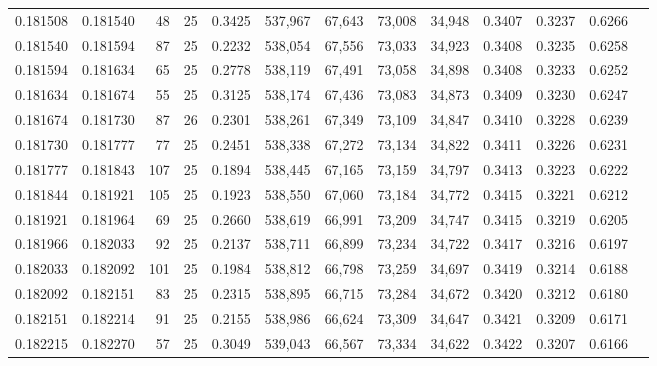 \begin{tabular}{rrrrrrrrrrrrr}
0.181508 & 0.181540 &    48 &  25 &                                     0.3425 & 537,967 &  67,643 &  73,008 &  34,948 & 0.3407 & 0.3237 & 0.6266 \\
0.181540 & 0.181594 &    87 &  25 &                                     0.2232 & 538,054 &  67,556 &  73,033 &  34,923 & 0.3408 & 0.3235 & 0.6258 \\
0.181594 & 0.181634 &    65 &  25 &                                     0.2778 & 538,119 &  67,491 &  73,058 &  34,898 & 0.3408 & 0.3233 & 0.6252 \\
0.181634 & 0.181674 &    55 &  25 &                                     0.3125 & 538,174 &  67,436 &  73,083 &  34,873 & 0.3409 & 0.3230 & 0.6247 \\
0.181674 & 0.181730 &    87 &  26 &                                     0.2301 & 538,261 &  67,349 &  73,109 &  34,847 & 0.3410 & 0.3228 & 0.6239 \\
0.181730 & 0.181777 &    77 &  25 &                                     0.2451 & 538,338 &  67,272 &  73,134 &  34,822 & 0.3411 & 0.3226 & 0.6231 \\
0.181777 & 0.181843 &   107 &  25 &                                     0.1894 & 538,445 &  67,165 &  73,159 &  34,797 & 0.3413 & 0.3223 & 0.6222 \\
0.181844 & 0.181921 &   105 &  25 &                                     0.1923 & 538,550 &  67,060 &  73,184 &  34,772 & 0.3415 & 0.3221 & 0.6212 \\
0.181921 & 0.181964 &    69 &  25 &                                     0.2660 & 538,619 &  66,991 &  73,209 &  34,747 & 0.3415 & 0.3219 & 0.6205 \\
0.181966 & 0.182033 &    92 &  25 &                                     0.2137 & 538,711 &  66,899 &  73,234 &  34,722 & 0.3417 & 0.3216 & 0.6197 \\
0.182033 & 0.182092 &   101 &  25 &                                     0.1984 & 538,812 &  66,798 &  73,259 &  34,697 & 0.3419 & 0.3214 & 0.6188 \\
0.182092 & 0.182151 &    83 &  25 &                                     0.2315 & 538,895 &  66,715 &  73,284 &  34,672 & 0.3420 & 0.3212 & 0.6180 \\
0.182151 & 0.182214 &    91 &  25 &                                     0.2155 & 538,986 &  66,624 &  73,309 &  34,647 & 0.3421 & 0.3209 & 0.6171 \\
0.182215 & 0.182270 &    57 &  25 &                                     0.3049 & 539,043 &  66,567 &  73,334 &  34,622 & 0.3422 & 0.3207 & 0.6166 \\

\end{tabular}
